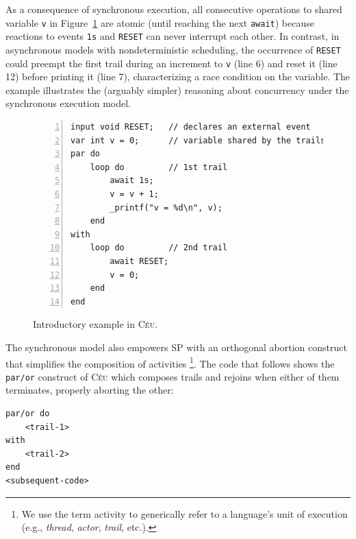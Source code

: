 \documentclass[preprint]{sigplanconf}
\newcommand{\CEU}{\textsc{C\'{e}u}\xspace}
\newcommand{\code}[1] {{\small{\texttt{#1}}}}
\newcommand{\1}{\;}
\newcommand{\2}{\;\;}
\newcommand{\3}{\;\;\;}
\newcommand{\5}{\;\;\;\;\;}
\begin{document}

As a consequence of synchronous execution, all consecutive operations to shared 
variable \code{v} in Figure~\ref{lst.intro} are atomic (until reaching the next 
\code{await}) because reactions to events \code{1s} and \code{RESET} can never 
interrupt each other.
%
In contrast, in asynchronous models with nondeterministic scheduling, the 
occurrence of \code{RESET} could preempt the first trail during an increment to 
\code{v} (line 6) and reset it (line 12) before printing it (line 7), 
characterizing a race condition on the variable.
%
The example illustrates the (arguably simpler) reasoning about concurrency 
under the synchronous execution model.

\begin{figure}%
\begin{lstlisting}[numbers=left,xleftmargin=3em]
input void RESET;   // declares an external event
var int v = 0;      // variable shared by the trails
par do
    loop do         // 1st trail
        await 1s;
        v = v + 1;
        _printf("v = %d\n", v);
    end
with
    loop do         // 2nd trail
        await RESET;
        v = 0;
    end
end
\end{lstlisting}
\caption{ Introductory example in \CEU.
\label{lst.intro}
}
\end{figure}


The synchronous model also empowers SP with an orthogonal abortion construct 
that simplifies the composition of activities%
\footnote{We use the term activity to generically refer to a language's unit of 
execution (e.g., \emph{thread}, \emph{actor}, \emph{trail}, etc.).}.
%
%
The code that follows shows the \code{par/or} construct of \CEU which composes 
trails and rejoins when either of them terminates, properly aborting the other:

\begin{lstlisting}
par/or do
    <trail-1>
with
    <trail-2>
end
<subsequent-code>
\end{lstlisting}

\end{document}
